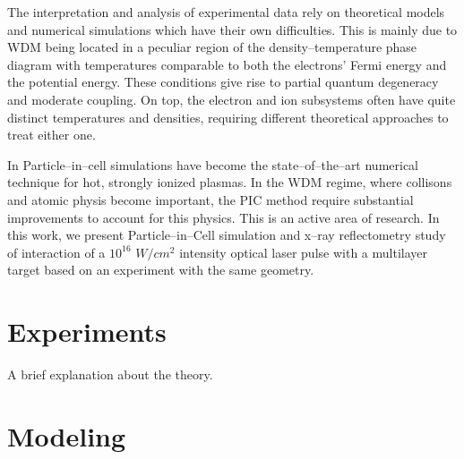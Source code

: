 \documentclass[preprint, 12pt]{elsarticle}
\begin{document}
The interpretation and analysis of experimental data
rely on theoretical models
and numerical simulations which have their own difficulties.
This is mainly due to WDM being located in a peculiar region of the density--temperature phase
diagram with temperatures comparable to both the electrons' Fermi energy and the
potential energy. These conditions give rise to partial quantum degeneracy and
moderate coupling. On top, the electron and ion subsystems often have quite distinct
temperatures and densities, requiring different theoretical approaches to treat
either one.

In
Particle--in--cell simulations \cite{} have become the state--of--the--art
numerical technique for hot, strongly ionized plasmas. In the WDM regime, where
collisons and atomic physis become important, the PIC method require substantial
improvements to account for this physics. This is an active area of research.
In this work, we present Particle--in--Cell simulation and x--ray reflectometry
study of interaction of a $10^{16}$ $W/cm^2$ intensity optical laser pulse with
a multilayer target based on an experiment with the same geometry.

\section{Experiments}

A brief explanation about the theory.

\section{Modeling}
\label{S:2}
\end{document}
